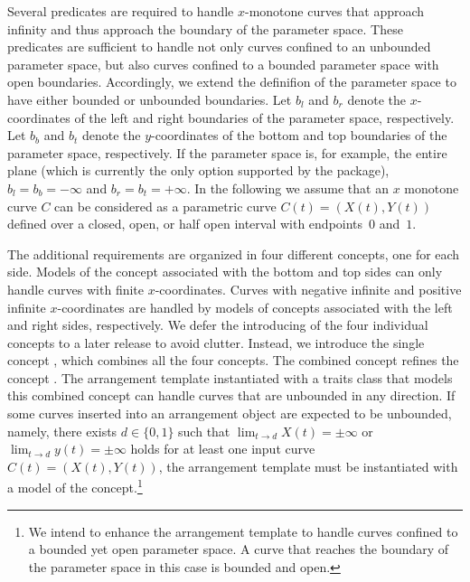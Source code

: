 Several predicates are required to handle $x$-monotone curves that
approach infinity and thus approach the boundary of the parameter
space. These predicates are sufficient to handle not only curves
confined to an unbounded parameter space, but also curves confined
to a bounded parameter space with open boundaries. Accordingly, we
extend the definifion of the parameter space to have either bounded or
unbounded boundaries. Let $b_l$ and $b_r$ denote the $x$-coordinates
of the left and right boundaries of the parameter space,
respectively. Let $b_b$ and $b_t$ denote the $y$-coordinates of the
bottom and top boundaries of the parameter space, respectively. If the
parameter space is, for example, the entire plane (which is currently
the only option supported by the package), $b_l = b_b = -\infty$ and
$b_r = b_t = +\infty$. In the following we assume that an $x$ monotone
curve $C$ can be considered as a parametric curve $C(t) = (X(t),Y(t))$
defined over a closed, open, or half open interval with endpoints~$0$
and~$1$.

The additional requirements are organized in four different concepts,
one for each side. Models of the concept associated with the bottom
and top sides can only handle curves with finite $x$-coordinates.
Curves with negative infinite and positive infinite $x$-coordinates
are handled by models of concepts associated with the left and right
sides, respectively. We defer the introducing of the four individual
concepts to a later release to avoid clutter. Instead, we introduce
the single concept , which
combines all the four concepts. The combined concept refines the
concept . The arrangement template
instantiated with a traits class that models this combined concept
can handle curves that are unbounded in any direction. If some
curves inserted into an arrangement object are expected to be
unbounded, namely, there exists $d \in \{0,1\}$ such that
$\lim_{t \rightarrow d}X(t) = \pm\infty$ or
$\lim_{t \rightarrow d}y(t) = \pm\infty$
holds for at least one input curve $C(t) = (X(t),Y(t))$, the arrangement
template must be instantiated with a model of the
 concept.\footnote{We
  intend to enhance the arrangement template to handle curves confined
  to a bounded yet open parameter space. A curve that reaches the
  boundary of the parameter space in this case is bounded and open.}

